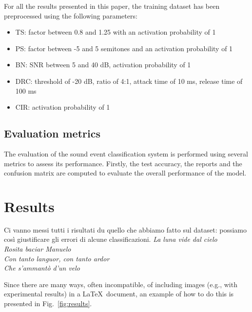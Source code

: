 \documentclass{article}
\begin{document}
\begin{sloppy}
For all the results presented in this paper, the training dataset has been preprocessed using the following parameters:
\begin{itemize}
    \item TS: factor between 0.8 and 1.25 with an activation probability of 1
    \item PS: factor between -5 and 5 semitones and an activation probability of 1
    \item BN: SNR between 5 and 40 dB, activation probability of 1
    \item DRC: threshold of -20 dB, ratio of 4:1, attack time of 10 ms, release time of 100 ms
    \item CIR: activation probability of 1
\end{itemize}


\subsection{Evaluation metrics}
\label{sec:metrics}
The evaluation of the sound event classification system is performed using several metrics to assess its performance.
Firstly, the test accuracy, the reports and the confusion matrix are computed to evaluate the overall performance of the model.




\section{Results}
\label{sec:results}

Ci vanno messi tutti i risultati du quello che abbiamo fatto sul dataset: possiamo così giustificare gli errori di alcune classificazioni.
\textit{La luna vide dal cielo}
\\\textit{Rosita baciar Manuelo}
\\\textit{Con tanto languor, con tanto ardor}
\\\textit{Che s'ammantò d'un velo}


Since there are many ways, often incompatible, of 
including images (e.g., with experimental results) 
in a \LaTeX\ document, an example of how to do
this is presented in Fig.~\ref{fig:results}.


\end{sloppy}
\end{document}
